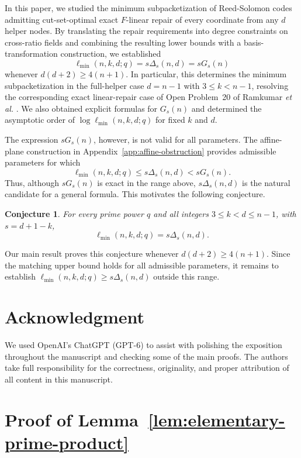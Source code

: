 \documentclass[11pt,onecolumn]{IEEEtran}
\newtheorem{conjecture}{Conjecture}
\newcommand{\ellmin}{\ell_{\min}}
\begin{document}
In this paper, we studied the minimum subpacketization of Reed-Solomon
codes admitting cut-set-optimal exact $F$-linear repair of every
coordinate from any $d$ helper nodes.  By translating the repair
requirements into degree constraints on cross-ratio fields and
combining the resulting lower bounds with a basis-transformation
construction, we established
\[
\ellmin(n,k,d;q)=s\Delta_s(n,d)=sG_s(n)
\]
whenever $d(d+2)\geq 4(n+1)$.  In particular, this determines the
minimum subpacketization in the full-helper case $d=n-1$ with
$3\le k<n-1$, resolving the corresponding exact linear-repair case of
Open Problem~20 of Ramkumar \emph{et al.}
\cite[Open Problem~20]{RamkumarEtAl2022}.  We also obtained explicit
formulas for $G_s(n)$ and determined the asymptotic order of
$\log\ellmin(n,k,d;q)$ for fixed $k$ and $d$.

The expression $sG_s(n)$, however, is not valid for all parameters.
The affine-plane construction in Appendix~\ref{app:affine-obstruction}
provides admissible parameters for which
\[
\ellmin(n,k,d;q)\le s\Delta_s(n,d)<sG_s(n).
\]
Thus, although $sG_s(n)$ is exact in the range above,
$s\Delta_s(n,d)$ is the natural candidate for a general formula.
This motivates the following conjecture.

\begin{conjecture}
For every prime power $q$ and all integers $3\le k<d\le n-1$,
with $s=d+1-k$,
\[
\ellmin(n,k,d;q)=s\Delta_s(n,d).
\]
\end{conjecture}

Our main result proves this conjecture whenever
$d(d+2)\geq 4(n+1)$.  Since the matching upper bound holds for all
admissible parameters, it remains to establish
$\ellmin(n,k,d;q)\ge s\Delta_s(n,d)$ outside this range.

\section*{Acknowledgment}
We used OpenAI's ChatGPT (GPT-6) to assist with polishing the exposition throughout the manuscript and checking some of the main proofs. The authors take full responsibility for the correctness, originality, and proper attribution of all content in this manuscript.

\appendices
\section{Proof of Lemma~\ref{lem:elementary-prime-product}}
\label{app:degree-arithmetic}
\end{document}
